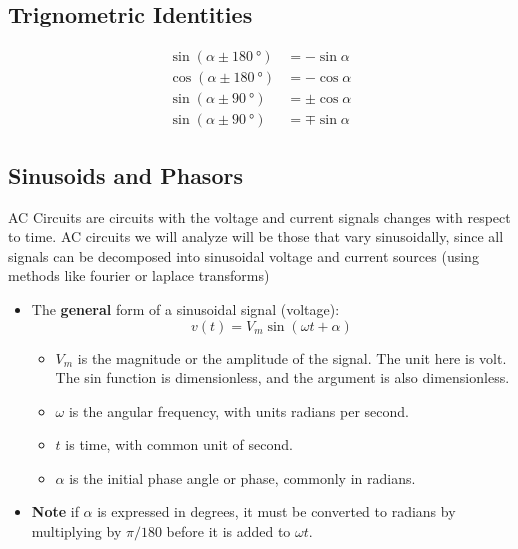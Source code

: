 \documentclass{article}
\begin{document}
\subsection{Trignometric Identities}
\begin{align}
    \sin(\alpha\pm\SI{180}{\degree})&=-\sin\alpha\\
    \cos(\alpha\pm\SI{180}{\degree})&=-\cos\alpha\\
    \sin(\alpha\pm\SI{90}{\degree})&=\pm\cos\alpha\\
    \sin(\alpha\pm\SI{90}{\degree})&=\mp\sin\alpha
\end{align}

\subsection{Sinusoids and Phasors}
\begin{definition}
    AC Circuits are circuits with the voltage and current signals changes with respect to time. AC circuits we will analyze will be those that vary sinusoidally, since all signals can be decomposed into sinusoidal voltage and current sources (using methods like fourier or laplace transforms)
\end{definition}
\begin{itemize}
    \item The \textbf{general} form of a sinusoidal signal (voltage):
    \begin{equation}
        v(t)=V_m\sin(\omega t+\alpha)
    \end{equation}
    \begin{itemize}
        \item $V_m$ is the magnitude or the amplitude of the signal. The unit here is volt. The sin function is dimensionless, and the argument is also dimensionless.
        \item $\omega$ is the angular frequency, with units radians per second.
        \item $t$ is time, with common unit of second.
        \item $\alpha$ is the initial phase angle or phase, commonly in radians.  
    \end{itemize}
    \item \textbf{Note} if $\alpha$ is expressed in degrees, it must be converted to radians by multiplying by $\pi/180$ before it is added to $\omega t$.
\end{itemize}
\begin{center}
\end{center}
\end{document}
